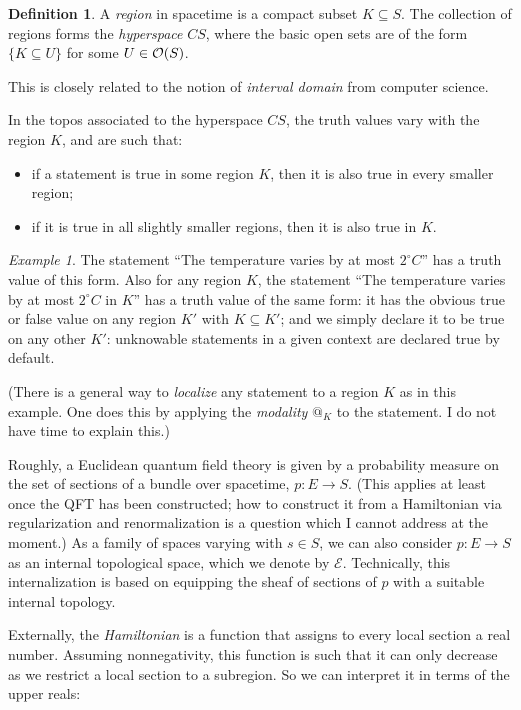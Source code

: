 \documentclass[11pt, oneside, article]{memoir}
\makeatletter
\theoremstyle{plain}
\theoremstyle{definition}
\newtheorem{definition}[theorem]{Definition}
\theoremstyle{remark}
\newtheorem{example}[theorem]{Example}
\newcommand{\AtSymbol}{{@}}
\newcommand{\At}[2][]{\AtSymbol^{#1}_{#2}}
\makeatother
\begin{document}
\begin{definition}
A \emph{region} in spacetime is a compact subset $K \subseteq S$. The collection of regions forms the \emph{hyperspace} $CS$, where the basic open sets are of the form $\{ K \subseteq U \}$ for some $U\in\mathcal{O}(S)$.
\end{definition}

This is closely related to the notion of \emph{interval domain} from computer science.

In the topos associated to the hyperspace $CS$, the truth values vary with the region $K$, and are such that:
\begin{itemize}
\item if a statement is true in some region $K$, then it is also true in every smaller region; 
\item if it is true in all slightly smaller regions, then it is also true in $K$.
\end{itemize}

\begin{example}
The statement ``The temperature varies by at most $2^\circ C$'' has a truth value of this form. Also for any region $K$, the statement ``The temperature varies by at most $2^\circ C$ in $K$'' has a truth value of the same form: it has the obvious true or false value on any region $K'$ with $K\subseteq K'$; and we simply declare it to be true on any other $K'$: unknowable statements in a given context are declared true by default.

(There is a general way to \emph{localize} any statement to a region $K$ as in this example. One does this by applying the \emph{modality} $\At{K}$ to the statement. I do not have time to explain this.)
\end{example}

Roughly, a Euclidean quantum field theory is given by a probability measure on the set of sections of a bundle over spacetime, $p : E \to S$. (This applies at least once the QFT has been constructed; how to construct it from a Hamiltonian via regularization and renormalization is a question which I cannot address at the moment.) As a family of spaces varying with $s\in S$, we can also consider $p : E \to S$ as an internal topological space, which we denote by $\mathcal{E}$. Technically, this internalization is based on equipping the sheaf of sections of $p$ with a suitable internal topology.

Externally, the \emph{Hamiltonian} is a function that assigns to every local section a real number. Assuming nonnegativity, this function is such that it can only decrease as we restrict a local section to a subregion. So we can interpret it in terms of the upper reals:
\end{document}
